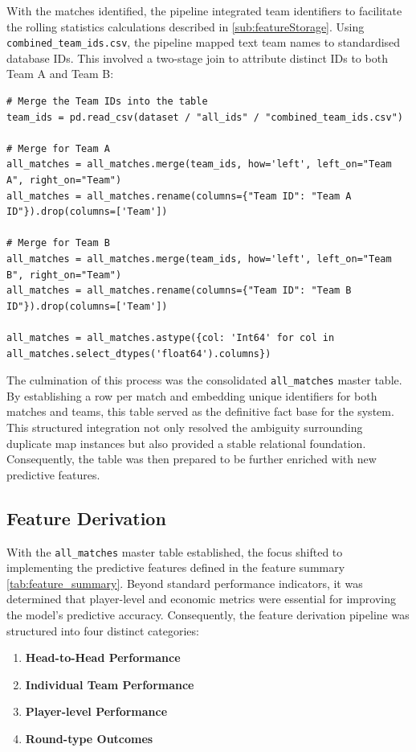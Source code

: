 With the matches identified, the pipeline integrated team identifiers to facilitate the rolling statistics calculations described in \autoref{sub:featureStorage}. Using \texttt{combined\_team\_ids.csv}, the pipeline mapped text team names to standardised database IDs. This involved a two-stage join to attribute distinct IDs to both Team A and Team B:

\begin{lstlisting}[style=code, caption={Merging the team IDs into all_matches for Team A and Team B}]
# Merge the Team IDs into the table
team_ids = pd.read_csv(dataset / "all_ids" / "combined_team_ids.csv")

# Merge for Team A
all_matches = all_matches.merge(team_ids, how='left', left_on="Team A", right_on="Team")
all_matches = all_matches.rename(columns={"Team ID": "Team A ID"}).drop(columns=['Team'])

# Merge for Team B
all_matches = all_matches.merge(team_ids, how='left', left_on="Team B", right_on="Team")
all_matches = all_matches.rename(columns={"Team ID": "Team B ID"}).drop(columns=['Team'])

all_matches = all_matches.astype({col: 'Int64' for col in all_matches.select_dtypes('float64').columns})
\end{lstlisting}

The culmination of this process was the consolidated \texttt{all_matches} master table. By establishing a row per match and embedding unique identifiers for both matches and teams, this table served as the definitive fact base for the system. This structured integration not only resolved the ambiguity surrounding duplicate map instances but also provided a stable relational foundation. Consequently, the table was then prepared to be further enriched with new predictive features.

\subsection{Feature Derivation}
\label{sub:featureDerivation}
With the \texttt{all_matches} master table established, the focus shifted to implementing the predictive features defined in the feature summary \autoref{tab:feature_summary}. Beyond standard performance indicators, it was determined that player-level and economic metrics were essential for improving the model's predictive accuracy. Consequently, the feature derivation pipeline was structured into four distinct categories:
\begin{enumerate}
    \item \textbf{Head-to-Head Performance}
    \item \textbf{Individual Team Performance} 
    \item \textbf{Player-level Performance}
    \item \textbf{Round-type Outcomes}
\end{enumerate}

